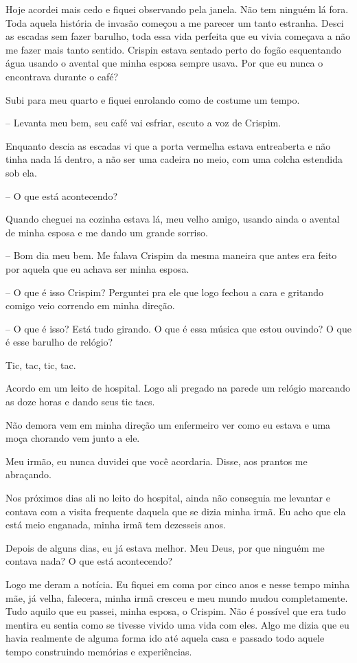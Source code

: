 Hoje acordei mais cedo e fiquei observando pela janela. Não tem ninguém lá fora. Toda aquela história de invasão começou a me parecer um tanto estranha.
Desci as escadas sem fazer barulho, toda essa vida perfeita que eu vivia começava a não me fazer mais tanto sentido. Crispin estava sentado perto do fogão esquentando água usando o avental que minha esposa sempre usava. Por que eu nunca o encontrava durante o café?

Subi para meu quarto e fiquei enrolando como de costume um tempo.

-- Levanta meu bem, seu café vai esfriar, escuto a voz de Crispim.

Enquanto descia as escadas vi que a porta vermelha estava entreaberta e não tinha nada lá dentro, a não ser uma cadeira no meio, com uma colcha estendida sob ela.

-- O que está acontecendo?

Quando cheguei na cozinha estava lá, meu velho amigo, usando ainda o avental de minha esposa e me dando um grande sorriso.

-- Bom dia meu bem. Me falava Crispim da mesma maneira que antes era feito por aquela que eu achava ser minha esposa.

-- O que é isso Crispim? Perguntei pra ele que logo fechou a cara e gritando comigo veio correndo em minha direção.

-- O que é isso? Está tudo girando. O que é essa música que estou ouvindo? O que é esse barulho de relógio?

Tic, tac, tic, tac.

Acordo em um leito de hospital. Logo ali pregado na parede um relógio marcando as doze horas e dando seus tic tacs.

Não demora vem em minha direção um enfermeiro ver como eu estava e uma moça chorando vem junto a ele.

Meu irmão, eu nunca duvidei que você acordaria. Disse, aos prantos me abraçando.

Nos próximos dias ali no leito do hospital, ainda não conseguia me levantar e contava com a visita frequente daquela que se dizia minha irmã. Eu acho que ela está meio enganada, minha irmã tem dezesseis anos.

Depois de alguns dias, eu já estava melhor. Meu Deus, por que ninguém me contava nada? O que está acontecendo?

Logo me deram a notícia. Eu fiquei em coma por cinco anos e nesse tempo minha mãe, já velha, falecera, minha irmã cresceu e meu mundo mudou completamente.
Tudo aquilo que eu passei, minha esposa, o Crispim. Não é possível que era tudo mentira eu sentia como se tivesse vivido uma vida com eles. Algo me dizia que eu havia realmente de alguma forma ido até aquela casa e passado todo aquele tempo construindo memórias e experiências.


